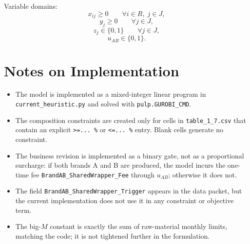 Variable domains:
\[
x_{ij}\ge 0 \qquad \forall i\in R,\; j\in J,
\]
\[
y_j\ge 0 \qquad \forall j\in J,
\]
\[
z_j\in\{0,1\} \qquad \forall j\in J,
\]
\[
u_{AB}\in\{0,1\}.
\]

\section*{Notes on Implementation}

\begin{itemize}
    \item The model is implemented as a mixed-integer linear program in \texttt{current\_heuristic.py} and solved with \texttt{pulp.GUROBI\_CMD}.
    \item The composition constraints are created only for cells in \texttt{table\_1\_7.csv} that contain an explicit \texttt{>=... \%} or \texttt{<=... \%} entry. Blank cells generate no constraint.
    \item The business revision is implemented as a binary gate, not as a proportional surcharge: if both brands A and B are produced, the model incurs the one-time fee \texttt{BrandAB\_SharedWrapper\_Fee} through $u_{AB}$; otherwise it does not.
    \item The field \texttt{BrandAB\_SharedWrapper\_Trigger} appears in the data packet, but the current implementation does not use it in any constraint or objective term.
    \item The big-$M$ constant is exactly the sum of raw-material monthly limits, matching the code; it is not tightened further in the formulation.
\end{itemize}
